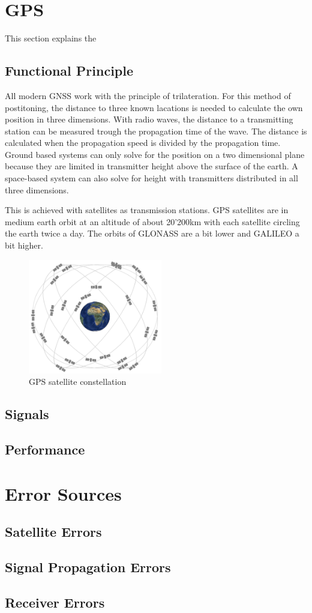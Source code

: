 \section{GPS}

This section explains the 

\subsection{Functional Principle}

All modern GNSS work with the principle of trilateration.
For this method of postitoning, the distance to three known lacations is needed to calculate the own position in three dimensions.
With radio waves, the distance to a transmitting station can be measured trough the propagation time of the wave.
The distance is calculated when the propagation speed is divided by the propagation time.
Ground based systems can only solve for the position on a two dimensional plane because they are limited in transmitter height above the surface of the earth.
A space-based system can also solve for height with transmitters distributed in all three dimensions.

This is achieved with satellites as transmission stations.
GPS satellites are in medium earth orbit at an altitude of about 20'200km with each satellite circling the earth twice a day.
The orbits of GLONASS are a bit lower and GALILEO a bit higher.

\begin{figure}[ht]
 \centering
 \includegraphics[height=5cm]{images/constellation.jpg}
 \caption{GPS satellite constellation \cite{GPS_GOV}}
\end{figure}


 
\subsection{Signals}

\subsection{Performance}


\section{Error Sources}

\subsection{Satellite Errors}

\subsection{Signal Propagation Errors}

\subsection{Receiver Errors}

